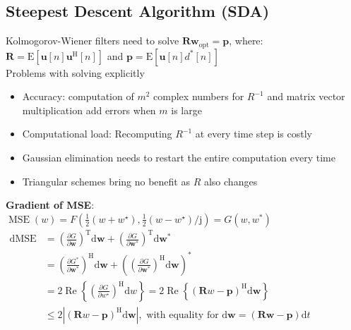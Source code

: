 \documentclass[english]{latex4ei/latex4ei_sheet}
\begin{document}
\begin{sectionbox}
  \subsection{Steepest Descent Algorithm (SDA)}
  Kolmogorov-Wiener filters need to solve $\boldsymbol{R}\boldsymbol{w}_{\text{opt}} = \boldsymbol{p}$, where:\\
  $\boldsymbol{R}=\mathrm{E}\left[\boldsymbol{u}[n] \boldsymbol{u}^{\mathrm{H}}[n]\right]$ and $\boldsymbol{p}=\mathrm{E}\left[\boldsymbol{u}[n] d^{*}[n]\right]$\\
  Problems with solving explicitly
  \begin{itemize}
    \item Accuracy: computation of $m^2$ complex numbers for $R^{-1}$ and matrix vector multiplication add errors when $m$ is large 
    \item Computational load: Recomputing $R^{-1}$ at every time step is costly
    \item Gaussian elimination needs to restart the entire computation every time
    \item Triangular schemes bring no benefit as $R$ also changes
  \end{itemize}

  \textbf{Gradient of MSE}:\\
  $\operatorname{MSE}(w)=F\left(\frac{1}{2}\left(w+w^{\star}\right), \frac{1}{2}\left(w-w^{\star}\right) / \mathrm{j}\right)=G\left(w, w^{*}\right)$\\
  $\begin{aligned}\mathrm{dMSE}&=\left(\frac{\partial G}{\partial \boldsymbol{w}}\right)^{\mathrm{T}} \mathrm{d} \boldsymbol{w}+\left(\frac{\partial G}{\partial \boldsymbol{w}^{*}}\right)^{\mathrm{T}} \mathrm{d} \boldsymbol{w}^{*}\\&=\left(\frac{\partial G^{*}}{\partial \boldsymbol{w}^{*}}\right)^{\mathrm{H}} \mathrm{d} \boldsymbol{w}+\left(\left(\frac{\partial G}{\partial \boldsymbol{w}^{*}}\right)^{\mathrm{H}} \mathrm{d} \boldsymbol{w}\right)^{*}\\&=2 \operatorname{Re}\left\{\left(\frac{\partial G}{\partial w^{\star}}\right)^{\mathrm{H}} \mathrm{d} w\right\} = 2 \operatorname{Re}\left\{(\boldsymbol{R} w-\boldsymbol{p})^{\mathrm{H}} \mathrm{d} \boldsymbol{w}\right\}\\&\leq 2\left|(\boldsymbol{R} w-\boldsymbol{p})^{\mathrm{H}} \mathrm{d} \boldsymbol{w}\right|, \text{ with equality for } \mathrm{d} \boldsymbol{w}=(\boldsymbol{R} \boldsymbol{w}-\boldsymbol{p}) \mathrm{d} t\end{aligned}$\\
  


\end{sectionbox}
\end{document}
